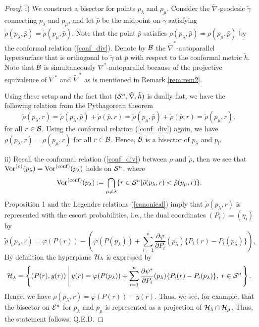 \documentclass{llncs}
\begin{document}
\begin{proof}
i) We construct a bisector for points $p_\lambda$ and $p_\mu$.
Consider the $\tilde \nabla$-geodesic $\tilde \gamma$ 
connecting $p_\lambda$ and $p_\mu$, and 
let $\bar{p}$ be the midpoint on $\tilde \gamma$ satisfying 
$\tilde \rho(p_\lambda,\bar{p})=\tilde \rho(p_\mu,\bar{p})$.
Note that the point $\bar{p}$ satisfies 
$\rho(p_\lambda,\bar{p})=\rho(p_\mu,\bar{p})$ 
by the conformal relation (\ref{conf_div}). 
Denote by ${\cal B}$ the $\tilde \nabla^*$-autoparallel hypersurface 
that is orthogonal to $\tilde \gamma$ at $\bar{p}$ 
with respect to the conformal metric $\tilde h$.
Note that ${\cal B}$ is simultaneously $\nabla^*$-autoparallel because of the 
projective equivalence of $\nabla^*$ and $\tilde \nabla^*$ as is 
mentioned in Remark \ref{rem:rem2}.

Using these setup and the fact that 
$({\cal S}^n, \tilde \nabla, \tilde h)$ is dually flat, 
we have the following relation from the Pythagorean theorem \cite{AN}
\[
	\tilde \rho(p_\lambda,r)=\tilde \rho(p_\lambda,\bar{p})+\tilde \rho(\bar{p},r)
	=\tilde \rho(p_\mu,\bar{p})+\tilde \rho(\bar{p},r)
	=\tilde \rho(p_\mu,r),
\]
for all $r \in {\cal B}$.
Using the conformal relation (\ref{conf_div}) again, 
we have $\rho(p_\lambda,r)=\rho(p_\mu,r)$ for all $r \in {\cal B}$.
Hence, ${\cal B}$ is a bisector of $p_\lambda$ and $p_l$.

ii) Recall 
the conformal relation (\ref{conf_div}) 
between $\rho$ and $\tilde \rho$, then we see that 
${\rm Vor}^{(\rho)}(p_\lambda)={\rm Vor}^{({\rm conf})}(p_\lambda)$ 
holds on ${\cal S}^n$, where 
\[
	{\rm Vor}^{({\rm conf})}(p_\lambda):=\bigcap_{\mu \not= \lambda} 
	\{ r \in {\cal S}^n | 
	\tilde \rho(p_\lambda,r)< \tilde \rho(p_\mu,r) \}.
\]
Proposition 1 and the Legendre relations (\ref{canonical}) 
imply that $\tilde \rho(p_\lambda,r)$ 
is represented with the escort probabilities, i.e., 
the dual coordinates $(P_i)=(\eta_i)$ by
\[
	\tilde \rho(p_\lambda,r)=\varphi(P(r))
	-\left( \varphi(P(p_\lambda)) 
	+ \sum_{i=1}^n \frac{\partial \varphi}{\partial P_i} (p_\lambda)
	\{P_i(r) - P_i(p_\lambda)\} \right),
\]
By definition the hyperplane ${\cal H}_\lambda$ is expressed by
\[
	{\cal H}_\lambda=\left\{(P(r),y(r)) \left|\; y(r)= \varphi(P(p_\lambda)) 
	+ \sum_{i=1}^n \frac{\partial \psi^*}{\partial P_i} (p_\lambda)
	\{P_i(r) - P_i(p_\lambda)\}, \; r \in {\cal S}^n \right. \right\}.
\]
Hence, we have $\tilde \rho(p_\lambda,r)=\varphi(P(r))-y(r)$.
Thus, we see, for example, that the bisector on ${\cal E}^n$ for 
$p_\lambda$ and $p_\mu$ is represented as a projection of 
${\cal H}_\lambda \cap {\cal H}_\mu$.
Thus, the statement follows.
\hfill Q.E.D.
\end{proof}
\end{document}
